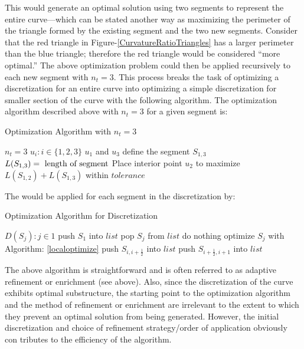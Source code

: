 \documentclass[preprint,12pt]{elsarticle}
\begin{document}
This would generate an optimal solution using two segments to represent the entire curve—which can be stated another way as maximizing the perimeter of the triangle formed by the existing segment and the two new segments.  Consider that the red triangle in Figure-\ref{CurvatureRatioTriangles} has a larger perimeter than the blue triangle; therefore the red triangle would be considered ``more optimal.'' The above optimization problem could then be applied recursively to each new segment with $n_t=3$.  This process breaks the task of optimizing a discretization for an entire curve into optimizing a simple discretization for smaller section of the curve with the following algorithm.  The optimization algorithm described above with $n_t=3$ for a given segment is:

\begin{algorithm}
\caption{Optimization Algorithm with $n_t=3$}\label{localoptimize}
\begin{algorithmic}[1]
\State $n_t = 3$
\State $u_i : i \in \{1,2,3\}$
\State $u_1 $ and $u_3$ define the segment $S_{1,3}$
  \State $L(S_{1,3}) =\textnormal{ length of segment}$
  \State Place interior point $u_2$ to maximize $L(S_{1,2})+L(S_{1,3})$ within $tolerance$
\EndProcedure
\end{algorithmic}
\end{algorithm}

The would be applied for each segment in the discretization by:

\begin{algorithm}
\caption{Optimization Algorithm for Discretization}
\begin{algorithmic}
  \State $D(S_j) : j \in {1}$
  \State push $S_1$ into $list$ 
    \State pop $S_j$ from $list$
      \State do nothing
    \Else
      \State optimize $S_j$ with Algorithm: \ref{localoptimize}
      \State push $S_{i,i+\frac{1}{2}}$ into $list$
      \State push $S_{i+\frac{1}{2},i+1}$ into $list$
    \EndIf
  \EndWhile
\end{algorithmic}
\end{algorithm}

The above algorithm is straightforward and is often referred to as adaptive refinement or enrichment (see above).  Also, since the discretization of the curve exhibits optimal substructure, the starting point to the optimization algorithm and the method of refinement or enrichment are irrelevant to the extent to which they prevent an optimal solution from being generated.  However, the initial discretization and choice of refinement strategy/order of application obviously con
tributes to the efficiency of the algorithm.
\end{document}
